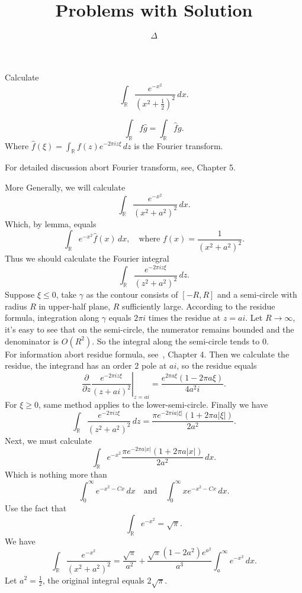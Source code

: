 \documentclass[12pt]{article}
\title{Problems with Solution}
\author{ \(\Delta\) }
\begin{document}
\maketitle

\section{}
\begin{prop}
  Calculate \[
    \int_{\mathbb{R}}\frac{e^{-x^2}}{(x^2+\frac{1}{2})^2}\,dx
  .\]
\end{prop}
\begin{lemma}
  \[
    \int_{\mathbb{R}}f\hat{g}=\int_{\mathbb{R}}\hat{f}g
  .\]
  Where \( \hat{f}(\xi)=\int_{\mathbb{R}}f(z)e^{-2\pi iz\xi}\,dz\) is the Fourier transform.
\end{lemma}
\noindent For detailed discussion abort Fourier transform, see\cite{stein_fourier_2003}, Chapter 5.

More Generally, we will calculate \[ \int_{\mathbb{R}}\frac{e^{-x^2}}{(x^2+a^2)^2}\,dx.\]
Which, by lemma, equals
\[
  \int_{\mathbb{R}}e^{-x^2}\hat{f}(x)\,dx,\quad\text{where }f(x)=\frac{1}{(x^2+a^2)^2}
.\]
Thus we should calculate the Fourier integral
\[
  \int_{\mathbb{R}}\frac{e^{-2\pi i z\xi}}{(z^2+a^2)^2}\,dz
.\]
% 
Suppose \(\xi\le 0\), take \(\gamma\) as the contour consists of \([-R,R]\) and a semi-circle with radius \(R\) in upper-half plane, \(R\) sufficiently large.
According to the residue formula, integration along \(\gamma\) equals \(2\pi i\) times the residue at \(z=ai\).
Let \(R\to\infty\), it's easy to see that on the semi-circle, the numerator remains bounded and the denominator is \(O(R^2)\). So the integral along the semi-circle tends to \(0\).\\
For information abort residue formula, see~\cite{ahlfors_complex_1979}, Chapter 4.
% 
Then we calculate the residue, the integrand has an order \(2\) pole at \(ai\), so the residue equals
\[
  \left.\frac{\partial}{\partial z}\frac{e^{-2\pi iz\xi}}{(z+ai)^2}\right|_{z=ai}=\frac{e^{2\pi a\xi}(1-2\pi a\xi)}{4a^2i}
.\]
For \(\xi\ge 0\), same method applies to the lower-semi-circle. Finally we have
\[
  \int_{\mathbb{R}}\frac{e^{-2\pi i z\xi}}{(z^2+a^2)^2}\,dz=\frac{\pi e^{-2\pi ia|\xi|}(1+2\pi a|\xi|)}{2a^2}
.\]
% 
Next, we must calculate
\[
  \int_{\mathbb{R}}e^{-x^2}\frac{\pi e^{-2\pi a|x|}(1+2\pi a|x|)}{2a^2}\,dx
.\]
Which is nothing more than
\[
  \int_0^\infty e^{-x^2-Cx}\,dx\quad \text{and} \quad \int_0^\infty xe^{-x^2-Cx}\,dx
.\]
Use the fact that
\[
  \int_{\mathbb{R}}e^{-x^2}=\sqrt{\pi}
.\]
We have
\[
  \int_{\mathbb{R}}\frac{e^{-x^2}}{(x^2+a^2)^2}=\frac{\sqrt{\pi}}{a^2}+\frac{\sqrt{\pi} (1-2a^2)e^{a^2}}{a^3}\int_a^\infty e^{-x^2}\,dx
.\]
Let \(a^2=\frac{1}{2}\), the original integral equals \(2\sqrt{\pi} \).
\end{document}

